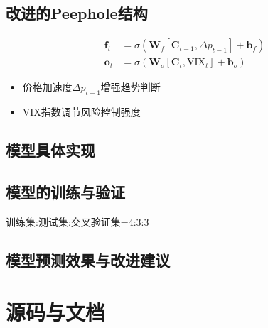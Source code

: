 \documentclass[a4paper,12pt]{ctexart}
\begin{document}
\subsection*{改进的Peephole结构}
\begin{equation*}
\begin{aligned}
\mathbf{f}_t &= \sigma\left(\mathbf{W}_f[\mathbf{C}_{t-1}, \Delta p_{t-1}] + \mathbf{b}_f\right) \\
\mathbf{o}_t &= \sigma\left(\mathbf{W}_o[\mathbf{C}_t, \text{VIX}_t] + \mathbf{b}_o\right)
\end{aligned}
\end{equation*}
\begin{itemize}
\item 价格加速度$\Delta p_{t-1}$增强趋势判断
\item VIX指数调节风险控制强度
\end{itemize}




\newpage
\subsection{模型具体实现}

\newpage
\subsection{模型的训练与验证}
训练集:测试集:交叉验证集=4:3:3

\newpage
\subsection{模型预测效果与改进建议}

\newpage

\section{源码与文档}
\end{document}

